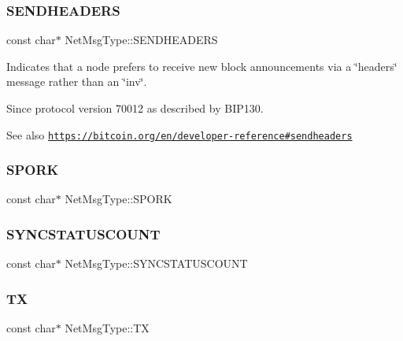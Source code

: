 \subsubsection{\texorpdfstring{S\+E\+N\+D\+H\+E\+A\+D\+E\+RS}{SENDHEADERS}}
{\footnotesize\ttfamily const char$\ast$ Net\+Msg\+Type\+::\+S\+E\+N\+D\+H\+E\+A\+D\+E\+RS}

Indicates that a node prefers to receive new block announcements via a \char`\"{}headers\char`\"{} message rather than an \char`\"{}inv\char`\"{}. \begin{DoxySince}{Since}
protocol version 70012 as described by B\+I\+P130. 
\end{DoxySince}
\begin{DoxySeeAlso}{See also}
\href{https://bitcoin.org/en/developer-reference#sendheaders}{\tt https\+://bitcoin.\+org/en/developer-\/reference\#sendheaders} 
\end{DoxySeeAlso}
\mbox{\label{namespace_net_msg_type_a6b65af6f0ed4fae98cf456e81656afed}} 
\subsubsection{\texorpdfstring{S\+P\+O\+RK}{SPORK}}
{\footnotesize\ttfamily const char$\ast$ Net\+Msg\+Type\+::\+S\+P\+O\+RK}

\mbox{\label{namespace_net_msg_type_aa2a144d4ca4cdecaf85f932f91407da2}} 
\subsubsection{\texorpdfstring{S\+Y\+N\+C\+S\+T\+A\+T\+U\+S\+C\+O\+U\+NT}{SYNCSTATUSCOUNT}}
{\footnotesize\ttfamily const char$\ast$ Net\+Msg\+Type\+::\+S\+Y\+N\+C\+S\+T\+A\+T\+U\+S\+C\+O\+U\+NT}

\mbox{\label{namespace_net_msg_type_a60f8316068456686ef69b0e07106d533}} 
\subsubsection{\texorpdfstring{TX}{TX}}
{\footnotesize\ttfamily const char$\ast$ Net\+Msg\+Type\+::\+TX}

